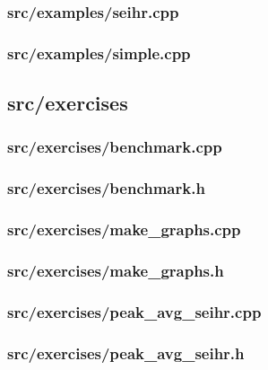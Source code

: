 \subsubsection{src/examples/seihr.cpp}\label{subsection:seihr}

\newpage
\subsubsection{src/examples/simple.cpp}\label{subsection:simple}


\newpage
\subsection{src/exercises}
\subsubsection{src/exercises/benchmark.cpp}\label{subsection:benchmark}

\newpage
\subsubsection{src/exercises/benchmark.h}

\newpage
\subsubsection{src/exercises/make\_graphs.cpp}

\newpage
\subsubsection{src/exercises/make\_graphs.h}

\newpage
\subsubsection{src/exercises/peak\_avg\_seihr.cpp}\label{subsection:peak_avg_seihr}

\newpage
\subsubsection{src/exercises/peak\_avg\_seihr.h}



